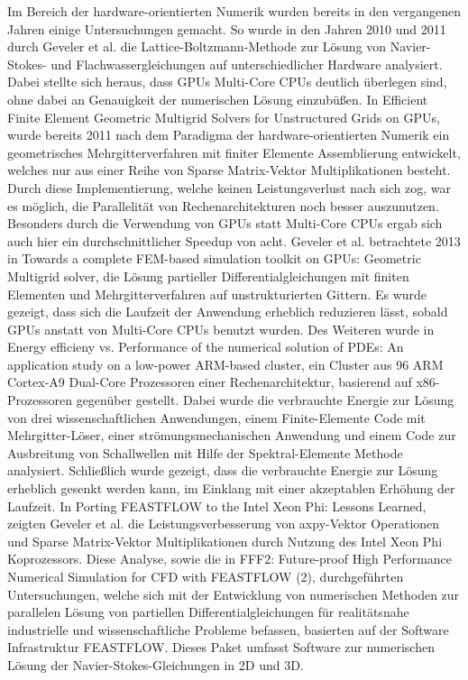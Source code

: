 Im Bereich der hardware-orientierten Numerik wurden bereits in den vergangenen Jahren einige Untersuchungen gemacht. So wurde in den Jahren 2010 und 2011 durch Geveler et al. \cite{GevelerRibbrockMallachGoeddeke2011} die Lattice-Boltzmann-Methode zur Lösung von Navier-Stokes- und Flachwassergleichungen auf unterschiedlicher Hardware analysiert. Dabei stellte sich heraus, dass GPUs Multi-Core CPUs deutlich überlegen sind, ohne dabei an Genauigkeit der numerischen Lösung einzubü\ss en. 
In \glqq Efficient Finite Element Geometric Multigrid Solvers for Unstructured Grids on GPUs\grqq\cite{GevelerRibbrockGoeddekeZajacTurek2011}, wurde bereits 2011 nach dem Paradigma der hardware-orientierten Numerik ein geometrisches Mehrgitterverfahren mit finiter Elemente Assemblierung entwickelt, welches nur aus einer Reihe von Sparse Matrix-Vektor Multiplikationen besteht. Durch diese Implementierung, welche keinen Leistungsverlust nach sich zog, war es möglich, die Parallelität von Rechenarchitekturen noch besser auszunutzen. Besonders durch die Verwendung von GPUs statt Multi-Core CPUs ergab sich auch hier ein durchschnittlicher Speedup von acht.
Geveler et al. betrachtete 2013 in \glqq 
Towards a complete FEM-based simulation toolkit on GPUs: Geometric Multigrid solver\grqq\cite{GevelerRibbrockGoeddekeZajacTurek2011c}, die Lösung partieller Differentialgleichungen mit finiten Elementen und Mehrgitterverfahren auf unstrukturierten Gittern. Es wurde gezeigt, dass sich die Laufzeit der Anwendung erheblich reduzieren lässt, sobald GPUs anstatt von Multi-Core CPUs benutzt wurden. 
Des Weiteren wurde in \glqq Energy efficieny vs. Performance of the numerical solution of PDEs: An application study on a low-power ARM-based cluster\grqq\cite{GoeddekeKomatitschGevelerRibbrockRajovicPuzovicRamirez2013}, ein Cluster aus 96 ARM Cortex-A9 Dual-Core Prozessoren einer Rechenarchitektur, basierend auf x86-Prozessoren gegenüber gestellt. Dabei wurde die verbrauchte Energie zur Lösung von drei wissenschaftlichen Anwendungen, einem Finite-Elemente Code mit Mehrgitter-Löser, einer strömungsmechanischen Anwendung und einem Code zur Ausbreitung von Schallwellen mit Hilfe der Spektral-Elemente Methode analysiert. Schließlich wurde gezeigt, dass die verbrauchte Energie zur Lösung erheblich gesenkt werden kann, im Einklang mit einer akzeptablen Erhöhung der Laufzeit. 
In \glqq Porting FEASTFLOW to the Intel Xeon Phi: Lessons Learned\grqq\cite{VenetisGoumasGevelerRibbrock2015}, zeigten Geveler et al. die Leistungsverbesserung von axpy-Vektor Operationen und Sparse Matrix-Vektor Multiplikationen durch Nutzung des Intel Xeon Phi Koprozessors. Diese Analyse, sowie die in \glqq FFF2: Future-proof High Performance Numerical Simulation for CFD with FEASTFLOW (2)\grqq\cite{GevelerRibbrock2015}, durchgeführten Untersuchungen, welche sich mit der Entwicklung von numerischen Methoden zur parallelen Lösung von partiellen Differentialgleichungen für realitätsnahe industrielle und wissenschaftliche Probleme befassen, basierten auf der Software Infrastruktur \glqq FEASTFLOW\grqq. Dieses Paket umfasst Software zur numerischen Lösung der Navier-Stokes-Gleichungen in 2D und 3D. 

